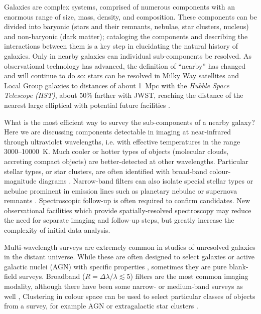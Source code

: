 

Galaxies are complex systems, comprised of numerous components with an enormous range of size,
mass, density, and composition.
These components can be divided into baryonic (stars and their remnants,
nebulae, star clusters, nucleus) and non-baryonic (dark matter);
cataloging the components and describing the interactions between them is a key step in elucidating the natural history of galaxies.
Only in nearby galaxies can individual sub-components be resolved.
As observational technology has advanced, the definition of ``nearby'' has changed and will continue to do so:
stars can be resolved in Milky Way satellites and Local Group galaxies to distances of about 1~Mpc with the {\em Hubble Space Telescope (HST)},
about 50\% farther with JWST,  reaching the distance of the nearest large elliptical with potential future facilities \citep{brown12}.


What is the most efficient way to survey the sub-components of a nearby galaxy?
Here we are discussing components detectable in imaging at near-infrared through ultraviolet wavelengths,
i.e. with effective temperatures in the range 3000--10000~K.
Much cooler or hotter types of objects (molecular clouds, accreting compact objects) are better-detected at other wavelengths.
Particular stellar types, or star clusters, are often identified with broad-band colour-magnitude diagrams \citep[e.g.][]{chandar10}.
Narrow-band filters can also isolate special stellar types \citep[e.g. Wolf-Rayet stars,][]{hadfield05} or nebulae prominent in emission
lines such as planetary nebulae or supernova remnants \citep{hermann08,blair14}.
Spectroscopic follow-up is often required to confirm candidates.
New observational facilities which provide spatially-resolved spectroscopy \citep[e.g.][]{yan16,sanchez12,drissen10} may reduce the need for separate imaging and follow-up steps,
but greatly increase the complexity of initial data analysis.


Multi-wavelength surveys are extremely common in studies of unresolved galaxies in the distant universe.
While these are often designed to select galaxies or active galactic nuclei (AGN) with specific properties \citep[e.g.][]{trenti11,timlin16},
sometimes they are pure blank-field surveys.
Broadband ($R=\Delta \lambda/\lambda \lesssim 5$) filters are the most common imaging modality,
although there have been some narrow- or medium-band surveys as well \citep[e.g. COMBO-17,][]{combo-17},
Clustering in colour space can be used to select particular classes of objects from a survey,
for example AGN  \citep[e.g.][]{secrest2015, dabrusco09} or extragalactic star clusters \citep[e.g.][]{dabrusco16, hollyhead15}. 

